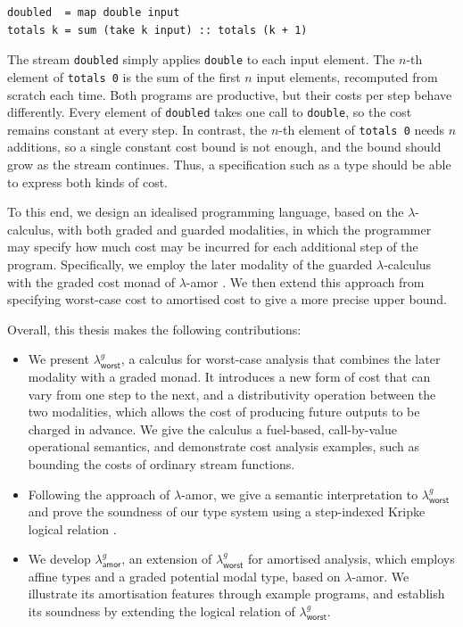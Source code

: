 \begin{lstlisting}[style=hs]
doubled  = map double input
totals k = sum (take k input) :: totals (k + 1)
\end{lstlisting}

\noindent
The stream \texttt{doubled} simply applies \texttt{double} to each input element. The $n$-th element of \texttt{totals~0} is the sum of
the first $n$ input elements, recomputed from scratch each time. Both programs are productive, but their costs per step behave differently. Every element of \texttt{doubled} takes one call to \texttt{double},
so the cost remains constant at every step. In contrast, the $n$-th element of \texttt{totals~0} needs $n$ additions, so a single
constant cost bound is not enough, and the bound should grow as the stream continues. Thus, a specification such as a type should be able
to express both kinds of cost.

To this end, we design an idealised programming language, based on the $\lambda$-calculus, with both graded and guarded
modalities, in which the programmer may specify how much cost may be incurred for each additional step of the program.
Specifically, we employ the later modality of the guarded $\lambda$-calculus \citep{cloustonGuardedLambdaCalculusProgramming2017a}
with the graded cost monad of $\lambda$-amor \citep{rajaniUnifyingTypetheoryHigherorder2021a}.
We then extend this approach from specifying worst-case cost to amortised cost \citep{tarjan85} to give a more precise upper bound.

Overall, this thesis makes the following contributions:
\begin{itemize}
  \item 
  We present $\lambda^g_{\mathsf{worst}}$, a calculus for worst-case analysis that combines the later modality with a graded monad. It introduces a new form of
  cost that can vary from one step to the next, and a distributivity operation between the two modalities,
  which allows the cost of producing future outputs to be charged in advance.
  We give the calculus a fuel-based, call-by-value operational semantics, and demonstrate cost analysis examples, such as bounding the costs of ordinary stream functions.
  \item 
  Following the approach of $\lambda$-amor, we give a semantic interpretation to $\lambda^g_{\mathsf{worst}}$ and prove the soundness of our type system using a step-indexed Kripke logical relation
  \citep{ahmed2004semantics}.
  \item 
  We develop $\lambda^g_{\mathsf{amor}}$, an extension of $\lambda^g_{\mathsf{worst}}$ for amortised analysis, which employs affine types and a graded
  potential modal type, based on $\lambda$-amor. We illustrate its amortisation features through example programs,
  and establish its soundness by extending the logical relation of $\lambda^g_{\mathsf{worst}}$. 
\end{itemize}
